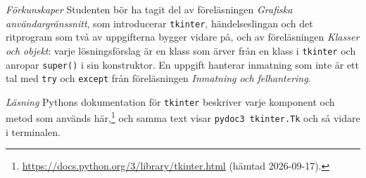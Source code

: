 \emph{Förkunskaper}
Studenten bör ha tagit del av föreläsningen \emph{Grafiska
användargränssnitt}, som introducerar \texttt{tkinter},
händelseslingan och det ritprogram som två av uppgifterna bygger vidare
på, och av föreläsningen \emph{Klasser och objekt}: varje
lösningsförslag är en klass som ärver från en klass i
\texttt{tkinter} och anropar \texttt{super()} i
sin konstruktor.  En uppgift hanterar inmatning som inte är ett tal med
\texttt{try} och \texttt{except} från
föreläsningen \emph{Inmatning och felhantering}.

\emph{Läsning}
Pythons dokumentation för \texttt{tkinter} beskriver varje
komponent och metod som används här,\footnote{%
  \url{https://docs.python.org/3/library/tkinter.html} (hämtad
  2026-09-17).}
och samma text visar \texttt{pydoc3 tkinter.Tk} och så vidare i
terminalen.
